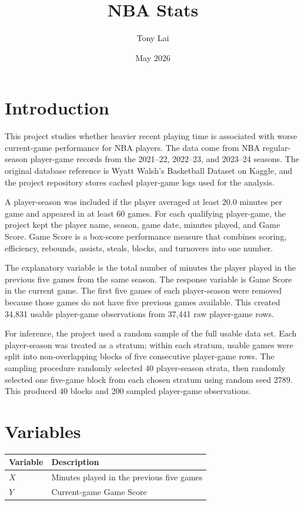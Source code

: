 \documentclass[12pt]{article}
\title{NBA Stats}
\author{Tony Lai}
\date{May 2026}
\begin{document}
\maketitle
\section*{Introduction}

This project studies whether heavier recent playing time is associated with worse current-game performance for NBA players. The data come from NBA regular-season player-game records from the 2021--22, 2022--23, and 2023--24 seasons. The original database reference is Wyatt Walsh's Basketball Dataset on Kaggle, and the project repository stores cached player-game logs used for the analysis.

A player-season was included if the player averaged at least 20.0 minutes per game and appeared in at least 60 games. For each qualifying player-game, the project kept the player name, season, game date, minutes played, and Game Score. Game Score is a box-score performance measure that combines scoring, efficiency, rebounds, assists, steals, blocks, and turnovers into one number.

The explanatory variable is the total number of minutes the player played in the previous five games from the same season. The response variable is Game Score in the current game. The first five games of each player-season were removed because those games do not have five previous games available. This created 34,831 usable player-game observations from 37,441 raw player-game rows.

For inference, the project used a random sample of the full usable data set. Each player-season was treated as a stratum; within each stratum, usable games were split into non-overlapping blocks of five consecutive player-game rows. The sampling procedure randomly selected 40 player-season strata, then randomly selected one five-game block from each chosen stratum using random seed 2789. This produced 40 blocks and 200 sampled player-game observations.

\section*{Variables}

\begin{center}
\begin{tabular}{ll}
\toprule
Variable & Description \\
\midrule
$X$ & Minutes played in the previous five games \\
$Y$ & Current-game Game Score \\
\bottomrule
\end{tabular}
\end{center}
\end{document}
